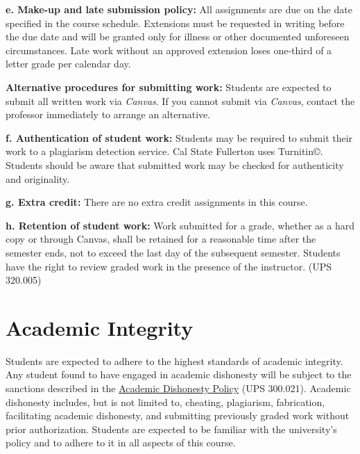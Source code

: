 \documentclass[12pt]{article}
\begin{document}
\vspace{1em}
\noindent \textbf{e. Make-up and late submission policy:}
All assignments are due on the date specified in the course schedule. Extensions must be requested in writing before the due date and will be granted only for illness or other documented unforeseen circumstances. Late work without an approved extension loses one-third of a letter grade per calendar day.

\vspace{0.5em}
\noindent \textbf{Alternative procedures for submitting work:}
Students are expected to submit all written work via \emph{Canvas}. If you cannot submit via \emph{Canvas}, contact the professor immediately to arrange an alternative.

\vspace{1em}
\noindent \textbf{f. Authentication of student work:}
Students may be required to submit their work to a plagiarism detection service. Cal State Fullerton uses Turnitin\copyright. Students should be aware that submitted work may be checked for authenticity and originality.

\vspace{1em}
\noindent \textbf{g. Extra credit:}
There are no extra credit assignments in this course.

\vspace{1em}
\noindent \textbf{h. Retention of student work:}
Work submitted for a grade, whether as a hard copy or through Canvas, shall be retained for a reasonable time after the semester ends, not to exceed the last day of the subsequent semester. Students have the right to review graded work in the presence of the instructor. (UPS 320.005)

\section*{Academic Integrity}
Students are expected to adhere to the highest standards of academic integrity. Any student found to have engaged in academic dishonesty will be subject to the sanctions described in the \href{https://www.fullerton.edu/senate/publications_policies_resolutions/ups/UPS\%20300/UPS\%20300.021.pdf}{Academic Dishonesty Policy} (UPS 300.021). Academic dishonesty includes, but is not limited to, cheating, plagiarism, fabrication, facilitating academic dishonesty, and submitting previously graded work without prior authorization. Students are expected to be familiar with the university's policy and to adhere to it in all aspects of this course.
\end{document}
